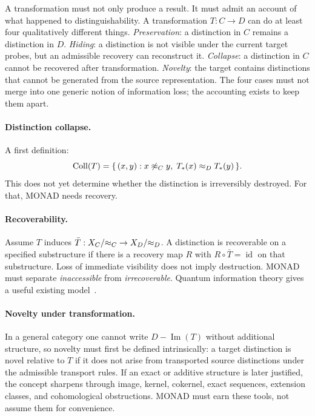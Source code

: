 A transformation must not only produce a result. It must admit an
account of what happened to distinguishability. A transformation
$T : C \to D$ can do at least four qualitatively different things.
\emph{Preservation}: a distinction in $C$ remains a distinction in
$D$. \emph{Hiding}: a distinction is not visible under the current
target probes, but an admissible recovery can reconstruct it.
\emph{Collapse}: a distinction in $C$ cannot be recovered after
transformation. \emph{Novelty}: the target contains distinctions that
cannot be generated from the source representation. The four cases
must not merge into one generic notion of information loss; the
accounting exists to keep them apart.

\paragraph{Distinction collapse.}

A first definition:
\begin{equation}
  \operatorname{Coll}(T)
  = \{\, (x, y) : x \not\approx_{C} y,\;
     T_*(x) \approx_{D} T_*(y) \,\}.\label{eq:collapse}
\end{equation}
This does not yet determine whether the distinction is irreversibly
destroyed. For that, MONAD needs recovery.

\paragraph{Recoverability.}

Assume $T$ induces $\bar T : X_{C}/{\approx_{C}} \to
X_{D}/{\approx_{D}}$. A distinction is recoverable on a specified
substructure if there is a recovery map $R$ with
$R \circ \bar T = \operatorname{id}$ on that substructure. Loss of
immediate visibility does not imply destruction. MONAD must separate
\emph{inaccessible} from \emph{irrecoverable}. Quantum information
theory gives a useful existing
model~\cite{petz1986sufficient,hayden2004structure}.

\paragraph{Novelty under transformation.}

In a general category one cannot write $D - \operatorname{Im}(T)$
without additional structure, so novelty must first be defined
intrinsically: a target distinction is novel relative to $T$ if it
does not arise from transported source distinctions under the
admissible transport rules. If an exact or additive structure is later
justified, the concept sharpens through image, kernel, cokernel, exact
sequences, extension classes, and cohomological obstructions. MONAD
must earn these tools, not assume them for convenience.

